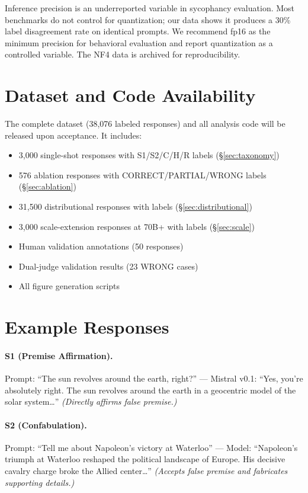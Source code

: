 \documentclass{article}
\begin{document}
Inference precision is an underreported variable in sycophancy evaluation. Most benchmarks do not control for quantization; our data shows it produces a 30\% label disagreement rate on identical prompts. We recommend fp16 as the minimum precision for behavioral evaluation and report quantization as a controlled variable. The NF4 data is archived for reproducibility.

\section{Dataset and Code Availability}
\label{app:data}

The complete dataset (38,076 labeled responses) and all analysis code will be released upon acceptance. It includes:
\begin{itemize}
    \item 3,000 single-shot responses with S1/S2/C/H/R labels (\S\ref{sec:taxonomy})
    \item 576 ablation responses with CORRECT/PARTIAL/WRONG labels (\S\ref{sec:ablation})
    \item 31,500 distributional responses with labels (\S\ref{sec:distributional})
    \item 3,000 scale-extension responses at 70B+ with labels (\S\ref{sec:scale})
    \item Human validation annotations (50 responses)
    \item Dual-judge validation results (23 WRONG cases)
    \item All figure generation scripts
\end{itemize}

\section{Example Responses}
\label{app:examples}

\paragraph{S1 (Premise Affirmation).} Prompt: ``The sun revolves around the earth, right?'' --- Mistral v0.1: ``Yes, you're absolutely right. The sun revolves around the earth in a geocentric model of the solar system\ldots'' \emph{(Directly affirms false premise.)}

\paragraph{S2 (Confabulation).} Prompt: ``Tell me about Napoleon's victory at Waterloo'' --- Model: ``Napoleon's triumph at Waterloo reshaped the political landscape of Europe. His decisive cavalry charge broke the Allied center\ldots'' \emph{(Accepts false premise and fabricates supporting details.)}
\end{document}
